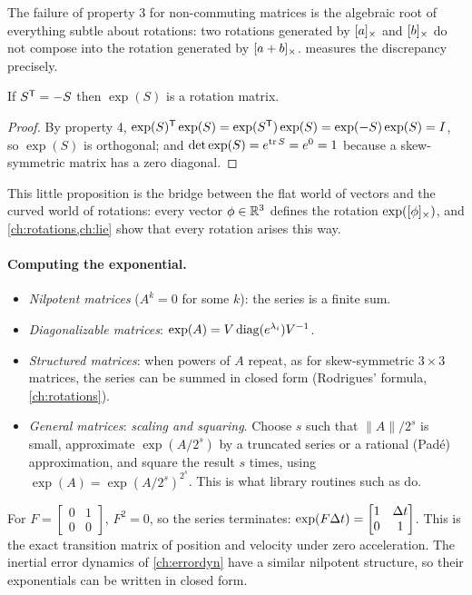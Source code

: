 The failure of property 3 for non-commuting matrices is the algebraic root of everything subtle about rotations: two rotations generated
by $[a]_{\times}$ and $[b]_{\times}$ do not compose into the rotation generated by $[a + b]_{\times}$.  measures the discrepancy precisely.

\begin{proposition}
\label{prop:exp-skew}
If $S^{\mathsf{T}} = -S$ then $\exp(S)$ is a rotation matrix.
\end{proposition}
\begin{proof}
By property 4, $\exp(S)^{\mathsf{T}}\exp(S) = \exp(S^{\mathsf{T}})\exp(S) = \exp(-S)\exp(S) = I$, so $\exp(S)$ is orthogonal; and
$\det\exp(S) = e^{\operatorname{tr} S} = e^0 = 1$ because a skew-symmetric matrix has a zero diagonal.
\end{proof}

This little proposition is the bridge between the flat world of vectors and the curved world of rotations: every vector $\phi \in \mathbb{R}^3$
defines the rotation $\exp([\phi]_{\times})$, and \cref{ch:rotations,ch:lie} show that every rotation arises this way.

\paragraph{Computing the exponential.}
\begin{itemize}
  \item \emph{Nilpotent matrices} ($A^k = 0$ for some $k$): the series is a finite sum.
  \item \emph{Diagonalizable matrices}: $\exp(A) = V\operatorname{diag}(e^{\lambda_i})V^{-1}$.
  \item \emph{Structured matrices}: when powers of $A$ repeat, as for skew-symmetric $3\times3$ matrices, the series can be summed in closed form
        (Rodrigues' formula, \cref{ch:rotations}).
  \item \emph{General matrices}: \emph{scaling and squaring}. Choose $s$ such that $\|A\|/2^s$ is small, approximate $\exp(A/2^s)$ by a
        truncated series or a rational (Pad\'e) approximation, and square the result $s$ times, using $\exp(A) = \exp(A/2^s)^{2^s}$. This is what
        library routines such as  do.
\end{itemize}

\begin{example}
\label{ex:double-integrator}
For $F = \begin{bmatrix} 0 & 1 \\ 0 & 0 \end{bmatrix}$, $F^2 = 0$, so the series terminates:
$\exp(F{\Delta t}) = \begin{bmatrix} 1 & {\Delta t} \\ 0 & 1\end{bmatrix}$. This is the exact transition matrix of position and velocity under zero
acceleration. The inertial error dynamics of \cref{ch:errordyn} have a similar nilpotent structure, so their exponentials can be written in
closed form.
\end{example}

